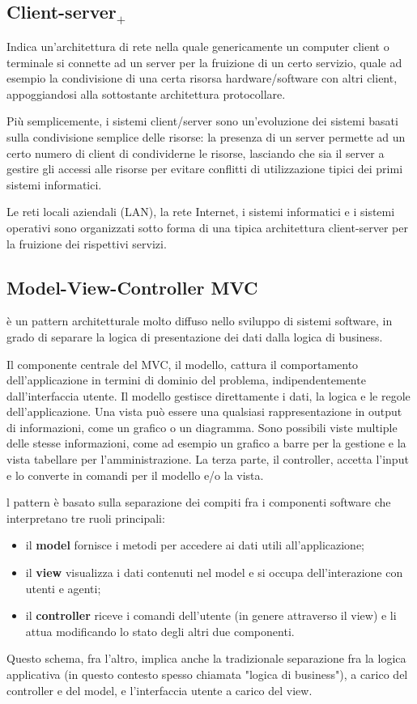 \subsection{Client-server$_+$}
Indica un'architettura di rete nella quale genericamente un computer client o terminale si connette ad un server per la fruizione di un certo servizio, quale ad esempio la condivisione di una certa risorsa hardware/software con altri client, appoggiandosi alla sottostante architettura protocollare.

Più semplicemente, i sistemi client/server sono un'evoluzione dei sistemi basati sulla condivisione semplice delle risorse: la presenza di un server permette ad un certo numero di client di condividerne le risorse, lasciando che sia il server a gestire gli accessi alle risorse per evitare conflitti di utilizzazione tipici dei primi sistemi informatici.

Le reti locali aziendali (LAN), la rete Internet, i sistemi informatici e i sistemi operativi sono organizzati sotto forma di una tipica architettura client-server per la fruizione dei rispettivi servizi.

\subsection{Model-View-Controller MVC}
è un pattern architetturale molto diffuso nello sviluppo di sistemi software, in grado di separare la logica di presentazione dei dati dalla logica di business.

Il componente centrale del MVC, il modello, cattura il comportamento dell'applicazione in termini di dominio del problema, indipendentemente dall'interfaccia utente. Il modello gestisce direttamente i dati, la logica e le regole dell'applicazione.
Una vista può essere una qualsiasi rappresentazione in output di informazioni, come un grafico o un diagramma. Sono possibili viste multiple delle stesse informazioni, come ad esempio un grafico a barre per la gestione e la vista tabellare per l'amministrazione. La terza parte, il controller, accetta l'input e lo converte in comandi per il modello e/o la vista.

l pattern è basato sulla separazione dei compiti fra i componenti software che interpretano tre ruoli principali:
\begin{itemize}
\item il \textbf{model} fornisce i metodi per accedere ai dati utili all'applicazione;
\item il \textbf{view} visualizza i dati contenuti nel model e si occupa dell'interazione con utenti e agenti;
\item il \textbf{controller} riceve i comandi dell'utente (in genere attraverso il view) e li attua modificando lo stato degli altri due componenti.
\end{itemize}
Questo schema, fra l'altro, implica anche la tradizionale separazione fra la logica applicativa (in questo contesto spesso chiamata "logica di business"), a carico del controller e del model, e l'interfaccia utente a carico del view.

